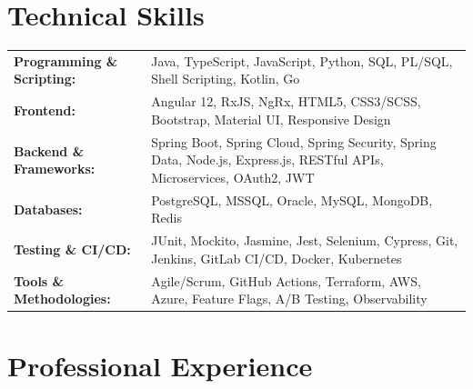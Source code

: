 \section{Technical Skills}
        \vspace{-14pt}
        \begin{table}[h]
            \fontsize{9pt}{10pt}\selectfont
            \begin{tabular}{p{0.3\linewidth} p{0.7\linewidth}}
                \textbf{Programming \& Scripting:} & Java, TypeScript, JavaScript, Python, SQL, PL/SQL, Shell Scripting, Kotlin, Go \\
                \textbf{Frontend:} & Angular 12\+, RxJS, NgRx, HTML5, CSS3/SCSS, Bootstrap, Material UI, Responsive Design \\
                \textbf{Backend \& Frameworks:} & Spring Boot, Spring Cloud, Spring Security, Spring Data, Node.js, Express.js, RESTful APIs, Microservices, OAuth2, JWT \\
                \textbf{Databases:} & PostgreSQL, MSSQL, Oracle, MySQL, MongoDB, Redis \\
                \textbf{Testing \& CI/CD:} & JUnit, Mockito, Jasmine, Jest, Selenium, Cypress, Git, Jenkins, GitLab CI/CD, Docker, Kubernetes \\
                \textbf{Tools \& Methodologies:} & Agile/Scrum, GitHub Actions, Terraform, AWS, Azure, Feature Flags, A/B Testing, Observability \\
            \end{tabular}
        \end{table}
    \vspace{-15pt}

\section{Professional Experience}
  \resumeSubHeadingListStart

